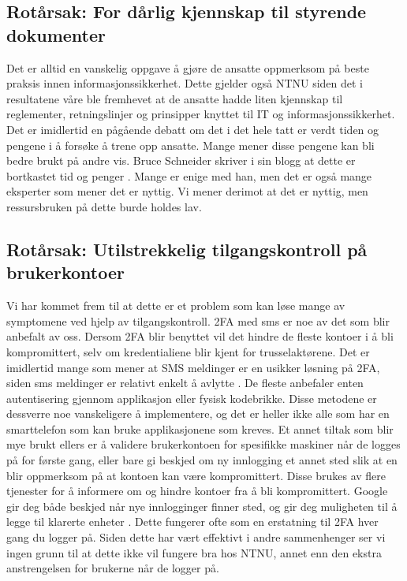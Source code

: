 \subsection*{Rotårsak: For dårlig kjennskap til styrende dokumenter}
Det er alltid en vanskelig oppgave å gjøre de ansatte oppmerksom på beste praksis innen informasjonssikkerhet. Dette gjelder også NTNU siden det i resultatene våre ble fremhevet at de ansatte hadde liten kjennskap til reglementer, retningslinjer og prinsipper knyttet til IT og informasjonssikkerhet. Det er imidlertid en pågående debatt om det i det hele tatt er verdt tiden og pengene i å forsøke å trene opp ansatte. Mange mener disse pengene kan bli bedre brukt på andre vis. Bruce Schneider skriver i sin blogg at dette er bortkastet tid og penger \cite{SecAware}. Mange er enige med han, men det er også mange eksperter som mener det er nyttig. Vi mener derimot at det er nyttig, men ressursbruken på dette burde holdes lav. 

\subsection*{Rotårsak: Utilstrekkelig tilgangskontroll på brukerkontoer}
Vi har kommet frem til at dette er et problem som kan løse mange av symptomene ved hjelp av tilgangskontroll. 2FA med sms er noe av det som blir anbefalt av oss. Dersom 2FA blir benyttet vil det hindre de fleste kontoer i å bli kompromittert, selv om kredentialiene blir kjent for trusselaktørene. Det er imidlertid mange som mener at SMS meldinger er en usikker løsning på 2FA, siden sms meldinger er relativt enkelt å avlytte \cite{2FA}. De fleste anbefaler enten autentisering gjennom applikasjon eller fysisk kodebrikke. Disse metodene er dessverre noe vanskeligere å implementere, og det er heller ikke alle som har en smarttelefon som kan bruke applikasjonene som kreves. Et annet tiltak som blir mye brukt ellers er å validere brukerkontoen for spesifikke maskiner når de logges på for første gang, eller bare gi beskjed om ny innlogging et annet sted slik at en blir oppmerksom på at kontoen kan være kompromittert. Disse brukes av flere tjenester for å informere om og hindre kontoer fra å bli kompromittert. Google gir deg både beskjed når nye innlogginger finner sted, og gir deg muligheten til å legge til klarerte enheter \cite{trustcomp}. Dette fungerer ofte som en erstatning til 2FA hver gang du logger på. Siden dette har vært effektivt i andre sammenhenger ser vi ingen grunn til at dette ikke vil fungere bra hos NTNU, annet enn den ekstra anstrengelsen for brukerne når de logger på. 



